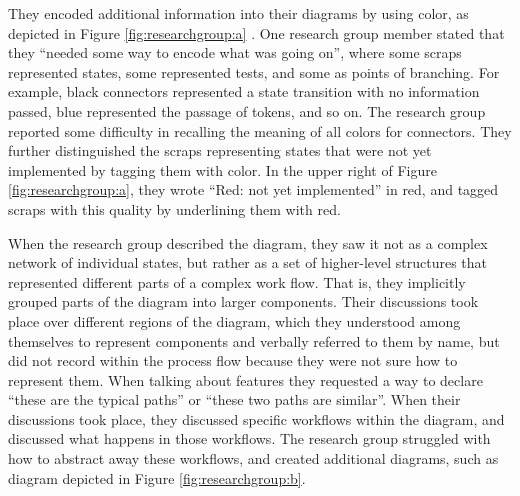 \documentclass[12pt,fleqn]{ucithesis}
\begin{document}
They encoded additional information into their diagrams by using color, as depicted in Figure \ref{fig:researchgroup:a} . One research group member stated that they ``needed some way to encode what was going on'', where some scraps represented states, some represented tests, and some as points of branching. For example, black connectors represented a state transition with no information passed, blue represented the passage of tokens, and so on. The research group reported some difficulty in recalling the meaning of all colors for connectors. They further distinguished the scraps representing states that were not yet implemented by tagging them with color. In the upper right of Figure \ref{fig:researchgroup:a}, they wrote ``Red: not yet implemented'' in red, and tagged scraps with this quality by underlining them with red. 


When the research group described the diagram, they saw it not as a complex network of individual states, but rather as a set of higher-level structures that represented different parts of a complex work flow. That is, they implicitly grouped parts of the diagram into larger components. Their discussions took place over different regions of the diagram, which they understood among themselves to represent components and verbally referred to them by name, but did not record within the process flow because they were not sure how to represent them. When talking about features they requested a way to declare ``these are the typical paths'' or ``these two paths are similar''. When their discussions took place, they discussed specific workflows within the diagram, and discussed what happens in those workflows. The research group struggled with how to abstract away these workflows, and created additional diagrams, such as diagram depicted in Figure \ref{fig:researchgroup:b}.

\end{document}
